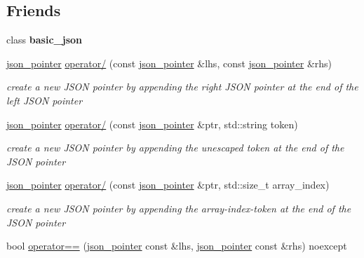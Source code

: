 \subsection*{Friends}
\begin{DoxyCompactItemize}
\item 
\mbox{\label{classnlohmann_1_1json__pointer_ada3100cdb8700566051828f1355fa745}} 
class {\bfseries basic\+\_\+json}
\item 
\mbox{\hyperlink{classnlohmann_1_1json__pointer}{json\+\_\+pointer}} \mbox{\hyperlink{classnlohmann_1_1json__pointer_a90a11fe6c7f37b1746a3ff9cb24b0d53}{operator/}} (const \mbox{\hyperlink{classnlohmann_1_1json__pointer}{json\+\_\+pointer}} \&lhs, const \mbox{\hyperlink{classnlohmann_1_1json__pointer}{json\+\_\+pointer}} \&rhs)
\begin{DoxyCompactList}\small\item\em create a new J\+S\+ON pointer by appending the right J\+S\+ON pointer at the end of the left J\+S\+ON pointer \end{DoxyCompactList}\item 
\mbox{\hyperlink{classnlohmann_1_1json__pointer}{json\+\_\+pointer}} \mbox{\hyperlink{classnlohmann_1_1json__pointer_a926c9065dbed1bedc17857a813f7a46f}{operator/}} (const \mbox{\hyperlink{classnlohmann_1_1json__pointer}{json\+\_\+pointer}} \&ptr, std\+::string token)
\begin{DoxyCompactList}\small\item\em create a new J\+S\+ON pointer by appending the unescaped token at the end of the J\+S\+ON pointer \end{DoxyCompactList}\item 
\mbox{\hyperlink{classnlohmann_1_1json__pointer}{json\+\_\+pointer}} \mbox{\hyperlink{classnlohmann_1_1json__pointer_a9f6bc6f4d4668b4e9a19d8b8ac29da4f}{operator/}} (const \mbox{\hyperlink{classnlohmann_1_1json__pointer}{json\+\_\+pointer}} \&ptr, std\+::size\+\_\+t array\+\_\+index)
\begin{DoxyCompactList}\small\item\em create a new J\+S\+ON pointer by appending the array-\/index-\/token at the end of the J\+S\+ON pointer \end{DoxyCompactList}\item 
bool \mbox{\hyperlink{classnlohmann_1_1json__pointer_a4667ef558c8c3f8a646bfda0c6654653}{operator==}} (\mbox{\hyperlink{classnlohmann_1_1json__pointer}{json\+\_\+pointer}} const \&lhs, \mbox{\hyperlink{classnlohmann_1_1json__pointer}{json\+\_\+pointer}} const \&rhs) noexcept

\end{DoxyCompactItemize}
